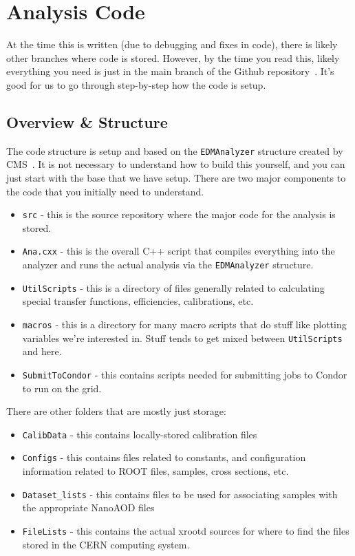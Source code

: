 \chapter{Analysis Code}\label{ch:ana_code}

At the time this is written (due to debugging and fixes in code), there is likely other branches where code is stored. However, by the time you read this, likely everything you need is just in the main branch of the Github repository~\cite{github}. It's good for us to go through step-by-step how the code is setup.

\section{Overview \& Structure}\label{sec:overview}
The code structure is setup and based on the \verb|EDMAnalyzer| structure created by CMS~\cite{edm_ana}. It is not necessary to understand how to build this yourself, and you can just start with the base that we have setup. There are two major components to the code that you initially need to understand.

\begin{itemize}
    \item \verb|src| - this is the source repository where the major code for the analysis is stored.
    \item \verb|Ana.cxx| - this is the overall C++ script that compiles everything into the analyzer and runs the actual analysis via the \verb|EDMAnalyzer| structure.
    \item \verb|UtilScripts| - this is a directory of files generally related to calculating special transfer functions, efficiencies, calibrations, etc. 
    \item \verb|macros| - this is a directory for many macro scripts that do stuff like plotting variables we're interested in. Stuff tends to get mixed between \verb|UtilScripts| and here.
    \item \verb|SubmitToCondor| - this contains scripts needed for submitting jobs to Condor to run on the grid.
\end{itemize}

There are other folders that are mostly just storage:

\begin{itemize}
    \item \verb|CalibData| - this contains locally-stored calibration files
    \item \verb|Configs| - this contains files related to constants, and configuration information related to ROOT files, samples, cross sections, etc.
    \item \verb|Dataset_lists| - this contains files to be used for associating samples with the appropriate NanoAOD files
    \item \verb|FileLists| - this contains the actual xrootd sources for where to find the files stored in the CERN computing system.
\end{itemize}

